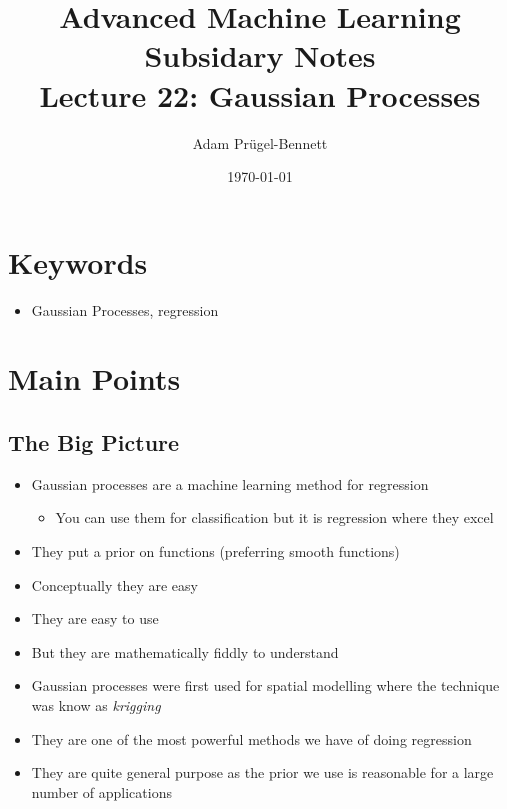 \documentclass[11pt]{article}
\author{Adam Prügel-Bennett}
\date{\today}
\title{Advanced Machine Learning Subsidary Notes\\\medskip
\large Lecture 22: Gaussian Processes}
\begin{document}
\maketitle


\section{Keywords}
\label{sec:orgf9837f6}
\begin{itemize}
\item Gaussian Processes, regression
\end{itemize}

\section{Main Points}
\label{sec:orga4003bd}

\subsection{The Big Picture}
\label{sec:orgbb44246}
\begin{itemize}
\item Gaussian processes are a machine learning method for regression
\begin{itemize}
\item You can use them for classification but it is regression where they excel
\end{itemize}
\item They put a prior on functions (preferring smooth functions)
\item Conceptually they are easy
\item They are easy to use
\item But they are mathematically fiddly to understand
\item Gaussian processes were first used for spatial modelling where
the technique was know as \emph{krigging}
\item They are one of the most powerful methods we have of doing regression
\item They are quite general purpose as the prior we use is reasonable
for a large number of applications
\end{itemize}
\end{document}
